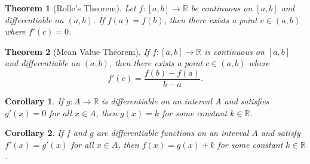 \documentclass{amsart}
\newtheorem*{theorem}{Theorem}
\newtheorem*{corollary}{Corollary}
\theoremstyle{definition}
\newcommand{\R}{\mathbb{R}}
\begin{document}
\begin{theorem}[Rolle's Theorem]
  Let $f : [a, b] \to \R$ be continuous on $[a, b]$ and differentiable on $(a,
  b)$. If $f(a) = f(b)$, then there exists a point $c \in (a, b)$ where $f'(c) =
  0$.
\end{theorem}

\begin{theorem}[Mean Value Theorem]
  If $f : [a, b] \to \R$ is continuous on $[a, b]$ and differentiable on $(a,
  b)$, then there exists a point $c \in (a, b)$ where
  \[
    f'(c) = \frac{f(b) - f(a)}{b - a}.
  \]
\end{theorem}

\begin{corollary}
  If $g : A \to \R$ is differentiable on an interval $A$ and satisfies $g'(x) =
  0$ for all $x \in A$, then $g(x) = k$ for some constant $k \in \R$.
\end{corollary}

\begin{corollary}
  If $f$ and $g$ are differentiable functions on an interval $A$ and satisfy
  $f'(x) = g'(x)$ for all $x \in A$, then $f(x) = g(x) + k$ for some constant $k
  \in \R$.
\end{corollary}
\end{document}
